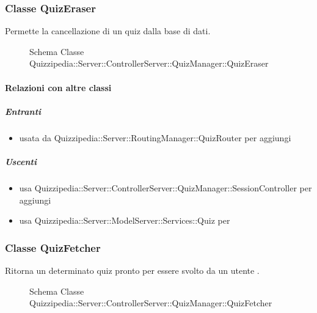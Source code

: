 \subsubsection{Classe QuizEraser}
Permette la cancellazione di un quiz dalla base di dati.
\begin{figure}[H]
\centering
\noindent{}
\caption[Schema Classe QuizEraser]{Schema Classe Quizzipedia::Server::ControllerServer::QuizManager::QuizEraser}
\end{figure}
\paragraph{Relazioni con altre classi}
\subparagraph{Entranti}
\begin{itemize}
\item usata da Quizzipedia::Server::RoutingManager::QuizRouter per aggiungi
\end{itemize}
\subparagraph{Uscenti}
\begin{itemize}
\item usa Quizzipedia::Server::ControllerServer::QuizManager::SessionController per aggiungi
\item usa Quizzipedia::Server::ModelServer::Services::Quiz per 
\end{itemize}
\subsubsection{Classe QuizFetcher}
Ritorna un determinato quiz pronto per essere svolto da un utente .
\begin{figure}[H]
\centering
\noindent{}
\caption[Schema Classe QuizFetcher]{Schema Classe Quizzipedia::Server::ControllerServer::QuizManager::QuizFetcher}
\end{figure}
